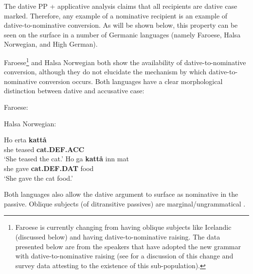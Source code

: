 The dative PP + applicative analysis claims that all recipients are dative case marked. Therefore, any example of a nominative recipient is an example of dative-to-nominative conversion. As will be shown below, this property can be seen on the surface in a number of Germanic languages (namely Faroese, Halsa Norwegian, and High German). 

Faroese\footnote{Faroese is currently changing from having oblique subjects like Icelandic (discussed below) and having dative-to-nominative raising. The data presented below are from the speakers that have adopted the new grammar with dative-to-nominative raising (see \cite{Eyorsson.2012} for a discussion of this change and survey data attesting to the existence of this sub-population).} and Halsa Norwegian both show the availability of dative-to-nominative conversion, although they do not elucidate the mechanism by which dative-to-nominative conversion occurs. Both languages have a clear morphological distinction between dative and accusative case:

\begin{exe}
	\ex Faroese:\label{ex:far-case}
		\begin{xlist}
		\end{xlist}
		\ex Halsa Norwegian:\label{ex:halsa-case}
	\begin{xlist}
		\ex \gll Ho erta \textbf{katt\aa} \\
		she teased \textbf{cat.DEF.ACC} \\
			\trans `She teased the cat.'
			\ex \gll Ho ga \textbf{katt\aa} inn mat \\
			she gave \textbf{cat.DEF.DAT} food \\
			\trans `She gave the cat food.'
	\end{xlist}
\end{exe}

Both languages also allow the dative argument to surface as nominative in the passive. Oblique subjects (of ditransitive passives) are marginal/ungrammatical \citep{Eyorsson.2012}.

